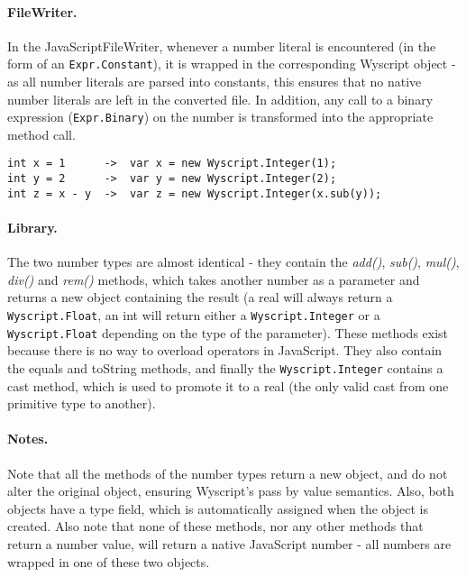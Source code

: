 \paragraph{FileWriter.} In the JavaScriptFileWriter, whenever a number literal is encountered (in the form of an \lstinline{Expr.Constant}), it is wrapped in the corresponding Wyscript object - as all number literals are parsed into constants, this ensures that no native number literals are left in the converted file. In addition, any call to a binary expression (\lstinline{Expr.Binary}) on the number is transformed into the appropriate method call.

\begin{lstlisting}
int x = 1      ->  var x = new Wyscript.Integer(1);
int y = 2      ->  var y = new Wyscript.Integer(2);
int z = x - y  ->  var z = new Wyscript.Integer(x.sub(y));
\end{lstlisting}

\paragraph{Library.} The two number types are almost identical - they contain the {\em add()}, {\em sub()}, {\em mul()}, {\em div()} and {\em rem()} methods, which takes another number as a parameter and returns a new object containing the result (a real will always return a \lstinline{Wyscript.Float}, an int will return either a \lstinline{Wyscript.Integer} or a \lstinline{Wyscript.Float} depending on the type of the parameter). These methods exist because there is no way to overload operators in JavaScript. They also contain the equals and toString methods, and finally the \lstinline{Wyscript.Integer} contains a cast method, which is used to promote it to a real (the only valid cast from one primitive type to another).

\paragraph{Notes.} Note that all the methods of the number types return a new object, and do not alter the original object, ensuring Wyscript's pass by value semantics. Also, both objects have a type field, which is automatically assigned when the object is created. Also note that none of these methods, nor any other methods that return a number value, will return a native JavaScript number - all numbers are wrapped in one of these two objects.


